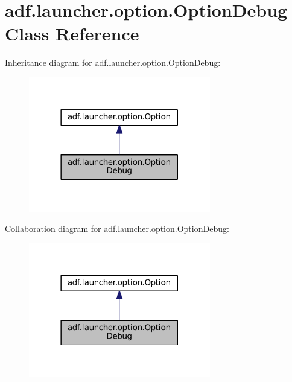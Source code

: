 \hypertarget{classadf_1_1launcher_1_1option_1_1OptionDebug}{}\section{adf.\+launcher.\+option.\+Option\+Debug Class Reference}
\label{classadf_1_1launcher_1_1option_1_1OptionDebug}


Inheritance diagram for adf.\+launcher.\+option.\+Option\+Debug\+:
\nopagebreak
\begin{figure}[H]
\begin{center}
\leavevmode
\includegraphics[width=225pt]{classadf_1_1launcher_1_1option_1_1OptionDebug__inherit__graph}
\end{center}
\end{figure}


Collaboration diagram for adf.\+launcher.\+option.\+Option\+Debug\+:
\nopagebreak
\begin{figure}[H]
\begin{center}
\leavevmode
\includegraphics[width=225pt]{classadf_1_1launcher_1_1option_1_1OptionDebug__coll__graph}
\end{center}
\end{figure}
